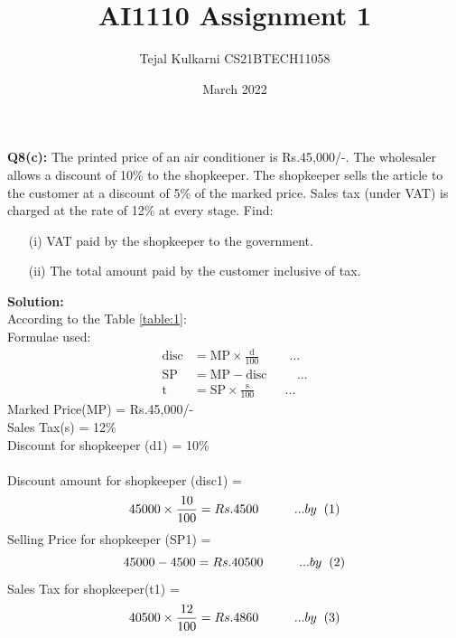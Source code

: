 \documentclass[12pt, twocolumn]{article}
\title{AI1110 Assignment 1}
\author{Tejal Kulkarni CS21BTECH11058}
\date{March 2022}
\begin{document}
\maketitle

\textbf{Q8(c):} The printed price of an air conditioner is  Rs.45,000/-. The wholesaler allows a discount of 10\% to the shopkeeper. The shopkeeper sells the article to the customer at a discount of 5\% of the marked price. Sales tax (under VAT) is charged at the rate of 12\% at every stage. Find:
\begin{enumerate}
\item[(i)]VAT paid by the shopkeeper to the government.
\item[(ii)]The total amount paid by the customer inclusive of tax. 
\end{enumerate}
\textbf{Solution:}\\
According to the Table \ref{table:1}:\\
Formulae used:
\begin{align}
  \text{disc} &= \text{MP}\times\frac{\text{d}}{100}\hspace{1cm}...\\ 
  \text{SP} &= \text{MP} - \text{disc} \hspace{1cm}...\\ 
  \text{t} &= \text{SP}\times\frac{\text{s}}{100}\hspace{1cm}...
\end{align}
Marked  Price(MP) = Rs.45,000/- \\
Sales  Tax(s) = 12\% \\
Discount  for  shopkeeper (d1) = 10\% \\ \\
Discount  amount for shopkeeper (disc1) =  \begin{equation*}
    45000\times\frac{10}{100} = Rs.4500 \hspace{1cm}... by \hspace{0.2cm} (1) 
    \end{equation*} 
Selling Price for shopkeeper (SP1) = \begin{equation*}
    45000 - 4500 = Rs.40500 \hspace{1cm}... by \hspace{0.2cm} (2)
\end{equation*}
Sales Tax for shopkeeper(t1) = \begin{equation*} 
    40500\times\frac{12}{100} =  Rs.4860 \hspace{1cm}... by \hspace{0.2cm} (3)
\end{equation*}
\end{document}

